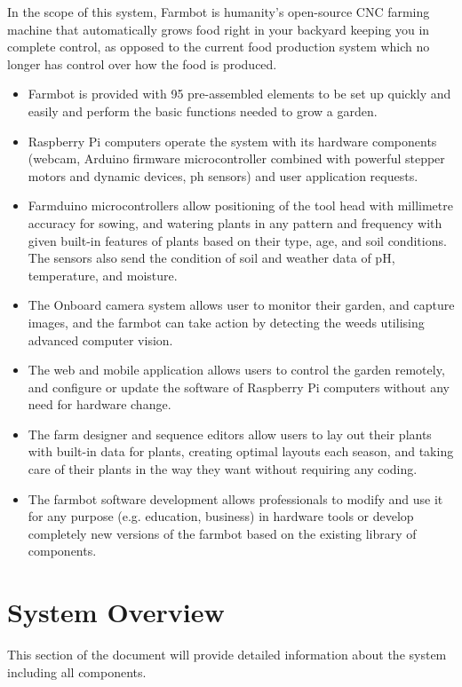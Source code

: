 In the scope of this system, Farmbot is humanity's open-source CNC farming machine that automatically grows food right in your backyard keeping you in complete control, as opposed to the current food production system which no longer has control over how the food is produced. 
\begin{itemize}
    \item Farmbot is provided with 95 pre-assembled elements to be set up quickly and easily and perform the basic functions needed to grow a garden.
    \item Raspberry Pi computers operate the system with its hardware components (webcam, Arduino firmware microcontroller combined with powerful stepper motors and dynamic devices, ph sensors) and user application requests.
    \item Farmduino microcontrollers allow positioning of the tool head with millimetre accuracy for sowing, and watering plants in any pattern and frequency with given built-in features of plants based on their type, age, and soil conditions. The sensors also send the condition of soil and weather data of pH, temperature, and moisture.
    \item The Onboard camera system allows user to monitor their garden, and capture images, and the farmbot can take action by detecting the weeds utilising advanced computer vision.
    \item The web and mobile application allows users to control the garden remotely, and configure or update the software of Raspberry Pi computers without any need for hardware change.
    \item The farm designer and sequence editors allow users to lay out their plants with built-in data for plants, creating optimal layouts each season, and taking care of their plants in the way they want without requiring any coding.
    \item The farmbot software development allows professionals to modify and use it for any purpose (e.g. education, business) in hardware tools or develop completely new versions of the farmbot based on the existing library of components.
    
\end{itemize}

\section{System Overview}

This section of the document will provide detailed information about the system
including all components.

